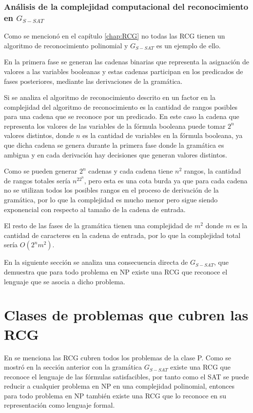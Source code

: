 \subsubsection{Análisis de la complejidad computacional del reconocimiento en $G_{S-SAT}$}

Como se mencionó en el capítulo \ref{chap:RCG} no todas las RCG tienen un algoritmo de reconocimiento polinomial
y $G_{S-SAT}$ es un ejemplo de ello.

En la primera fase se generan las cadenas binarias que representa la asignación de valores a las variables
booleanas y estas cadenas participan en los predicados de fases posteriores, mediante las derivaciones de la
gramática.

Si se analiza el algoritmo de reconocimiento descrito en \cite{mainRCGBib} un factor en la complejidad del
algoritmo de reconocimiento es la cantidad de rangos posibles para una cadena que se reconoce por un predicado.
En este caso la cadena que representa los valores de las variables de la fórmula booleana puede tomar
$2^n$ valores distintos, donde $n$ es la cantidad de variables en la fórmula booleana, ya que dicha cadena
se genera durante la primera fase donde la gramática es ambigua y en cada derivación hay decisiones que
generan valores distintos.

Como se pueden generar $2^n$ cadenas y cada cadena tiene $n^2$ rangos, la cantidad de rangos totales sería
$n^22^n$, pero esta es una cota burda ya que para cada cadena no se utilizan todos los posibles rangos en el
proceso de derivación de la gramática, por lo que la complejidad es mucho menor pero sigue siendo exponencial
con respecto al tamaño de la cadena de entrada.

El resto de las fases de la gramática tienen una complejidad de $m^2$ donde $m$
es la cantidad de caracteres en la cadena de entrada, por lo que la complejidad total sería $O(2^nm^2)$.

En la siguiente sección se analiza una consecuencia directa de $G_{S-SAT}$, que demuestra que
para todo problema en NP existe una RCG que reconoce el lenguaje que se asocia a dicho problema.
\section{Clases de problemas que cubren las RCG}

En \cite{propertiesRCGBib2} se menciona las RCG cubren todos los problemas de la clase P. Como se mostró en la sección anterior con la gramática $G_{S-SAT}$
existe una RCG que reconoce el lenguaje de las fórmulas satisfacibles, por tanto como el SAT se puede reducir
a cualquier problema en NP en una complejidad polinomial, entonces para todo problema en NP también existe una
RCG que lo reconoce en su representación como lenguaje formal.

